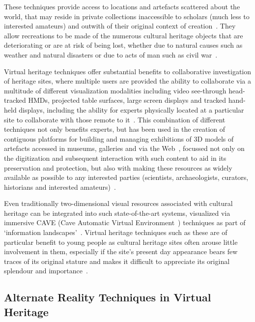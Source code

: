These techniques provide access to locations and artefacts scattered about the world, that may reside in private collections inaccessible to scholars (much less to interested amateurs) and outwith of their original context of creation~\cite{griffin:recovering}. They allow recreations to be made of the numerous cultural heritage objects that are deteriorating or are at risk of being lost, whether due to natural causes such as weather and natural disasters or due to acts of man such as civil war~\cite{Ikeuchi2003}.

Virtual heritage techniques offer substantial benefits to collaborative investigation of heritage sites, where multiple users are provided the ability to collaborate via a multitude of different visualization modalities including video see-through head-tracked HMDs, projected table surfaces, large screen displays and tracked hand-held displays, including the ability for experts physically located at a particular site to collaborate with those remote to it~\cite{benko:collaborative}. This combination of different techniques not only benefits experts, but has been used in the creation of contiguous platforms for building and managing exhibitions of 3D models of artefacts accessed in museums, galleries and via the Web~\cite{Wojciechowski2004}, focussed not only on the digitization and subsequent interaction with such content to aid in its preservation and protection, but also with making these resources as widely available as possible to any interested parties (scientists, archaeologists, curators, historians and interested amateurs)~\cite{walczak:applications}.

Even traditionally two-dimensional visual resources associated with cultural heritage can be integrated into such state-of-the-art systems, visualized via immersive CAVE (Cave Automatic Virtual Environment~\cite{Tzortzaki2002}) techniques as part of `information landscapes'~\cite{Ruffaldi2008}. Virtual heritage techniques such as these are of particular benefit to young people as cultural heritage sites often arouse little involvement in them, especially if the site's present day appearance bears few traces of its original stature and makes it difficult to appreciate its original splendour and importance~\cite{ardito:combining}.


\subsection{Alternate Reality Techniques in Virtual Heritage}


